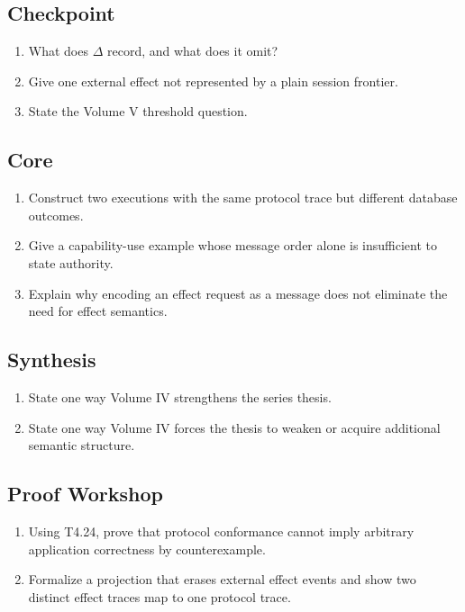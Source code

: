 \subsection*{Checkpoint}
\begin{enumerate}[label=\textbf{14.\arabic*},start=1]
\item What does $\Delta$ record, and what does it omit?
\item Give one external effect not represented by a plain session frontier.
\item State the Volume V threshold question.
\end{enumerate}
\subsection*{Core}
\begin{enumerate}[label=\textbf{14.\arabic*},start=4]
\item Construct two executions with the same protocol trace but different database outcomes.
\item Give a capability-use example whose message order alone is insufficient to state authority.
\item Explain why encoding an effect request as a message does not eliminate the need for effect semantics.
\end{enumerate}
\subsection*{Synthesis}
\begin{enumerate}[label=\textbf{14.\arabic*},start=7]
\item State one way Volume IV strengthens the series thesis.
\item State one way Volume IV forces the thesis to weaken or acquire additional semantic structure.
\end{enumerate}
\subsection*{Proof Workshop}
\begin{enumerate}[label=\textbf{14.\arabic*},start=9]
\item Using T4.24, prove that protocol conformance cannot imply arbitrary application correctness by counterexample.
\item Formalize a projection that erases external effect events and show two distinct effect traces map to one protocol trace.
\end{enumerate}
